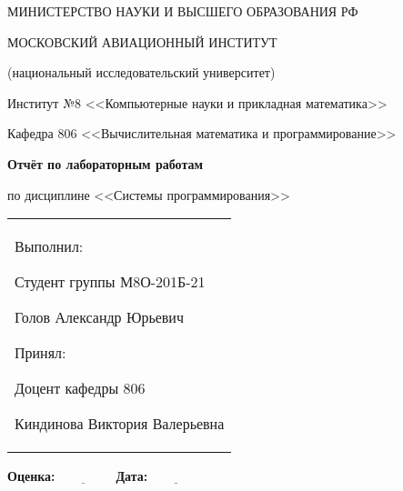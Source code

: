 \documentclass[12pt]{extarticle}
\begin{document}
		\begin{titlepage}
		\thispagestyle{specialfooter}
		
		\begin{center}
				МИНИСТЕРСТВО НАУКИ И ВЫСШЕГО ОБРАЗОВАНИЯ РФ
		
		\vspace{1cm}
		
		МОСКОВСКИЙ АВИАЦИОННЫЙ ИНСТИТУТ
		\par
		(национальный исследовательский университет)
		
		\vspace{1cm}
		
		Институт №8 <<Компьютерные науки и прикладная математика>>
		
		\par
		\vspace{1cm}
		
		Кафедра 806 <<Вычислительная математика и программирование>>
			
			\vfill
			
			{\Large \textbf{Отчёт по лабораторным работам}}
			\vspace{0.5cm}
			\par
			по дисциплине <<Системы программирования>>

		\end{center}
		
		\vfill
		
		\begin{minipage}{0.45\textwidth}
			
		\end{minipage}%
		\hfill
		\begin{minipage}{0.5\textwidth}
			\begin{tabular}{p{\textwidth}}
				\raggedright 
				Выполнил:
				\par
				Студент группы М8О-201Б-21
				\par
				Голов Александр Юрьевич
				\par
				\vspace{0.5cm}
				Принял:
				\par
				Доцент кафедры 806
				\par
				Киндинова Виктория Валерьевна
			\end{tabular}
		\end{minipage}%
		
		\vspace{2cm}
		
				\textbf{Оценка:$\underline{\; \; \; \; \; \; \; \; \; \; \; \; \; \; \; \;}$} \hfill \textbf{Дата:$\underline{\; \; \; \; \; \; \; \; \; \; \; \; \; \; \; \;}$}
		
		
	\end{titlepage}
\end{document}
